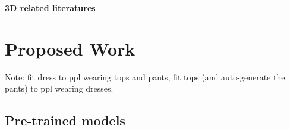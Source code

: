 \documentclass{article}
\begin{document}
\textbf{3D related literatures}



\section{Proposed Work}

Note: fit dress to ppl wearing tops and pants, fit tops (and auto-generate the pants) to ppl wearing dresses. 




\subsection{Pre-trained models}




\end{document}
